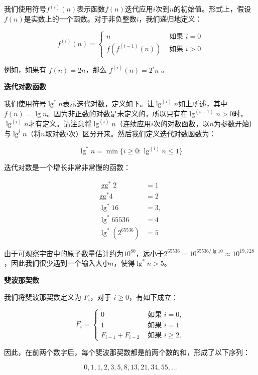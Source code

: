 \documentclass[lang=cn,newtx,10pt,scheme=chinese]{elegantbook}
\begin{document}
我们使用符号$f^{(i)}(n)$表示函数$f(n)$迭代应用$i$次到$n$的初始值。形式上，假设$f(n)$是实数上的一个函数。对于非负整数$i$，我们递归地定义：

\begin{equation}
f^{(i)}(n)= \begin{cases}n & \text { 如果 } i=0 \\ f(f^{(i-1)}(n)) & \text { 如果 } i>0\end{cases}
\end{equation}

例如，如果有 $f(n)=2 n$，那么 $f^{(i)}(n)=2^i n$ 。

\textbf{迭代对数函数}

我们使用符号$\lg ^* n$表示迭代对数，定义如下。让$\lg ^{(i)} n$如上所述，其中$f(n)=\lg n$。因为非正数的对数是未定义的，所以只有在$\lg ^{(i-1)} n>0$时，$\lg ^{(i)} n$才有定义。请注意将$\lg ^{(i)} n$（连续应用$i$次的对数函数，以$n$为参数开始）与$\lg ^i n$（将$n$取对数$i$次）区分开来。然后我们定义迭代对数函数为：

$$
\lg ^* n=\min \{i \geq 0: \lg ^{(i)} n \leq 1\}
$$

迭代对数是一个增长非常非常慢的函数：

$$
\begin{aligned}
\operatorname{gg}^* 2 & =1 \\
\mathrm{gg}^* 4 & =2 \\
\lg ^* 16 & =3, \\
\lg ^* 65536 & =4 \\
\lg ^*(2^{65536}) & =5
\end{aligned}
$$

由于可观察宇宙中的原子数量估计约为$10^{80}$，远小于$2^{65536}=10^{65536 / \lg 10} \approx 10^{19,728}$，因此我们很少遇到一个输入大小$n$，使得$\lg ^* n>5$。

\textbf{斐波那契数}

我们将斐波那契数定义为 $F_i$，对于 $i \geq 0$，有如下成立：

\begin{equation}
F_i= \begin{cases}0 & \text { 如果 } i=0, \\ 1 & \text { 如果 } i=1 \\ F_{i-1}+F_{i-2} & \text { 如果 } i \geq 2 .\end{cases}
\end{equation}

因此，在前两个数字后，每个斐波那契数都是前两个数的和，形成了以下序列：

$$
0,1,1,2,3,5,8,13,21,34,55,\ldots
$$
\end{document}
